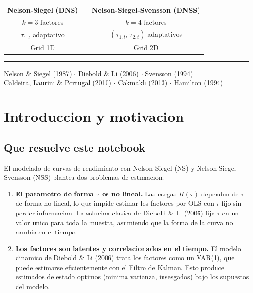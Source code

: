 \documentclass[12pt, a4paper]{article}
\theoremstyle{plain}
\theoremstyle{definition}
\theoremstyle{remark}
\begin{document}
\begin{titlepage}
\begin{center}
\vspace{1.8cm}

\begin{tabular}{ccc}
\textbf{Nelson-Siegel (DNS)} && \textbf{Nelson-Siegel-Svensson (DNSS)} \\[4pt]
$k = 3$ factores && $k = 4$ factores \\[2pt]
$\tau_{1,t}$ adaptativo && $(\tau_{1,t},\, \tau_{2,t})$ adaptativos \\[2pt]
Grid 1D && Grid 2D \\
\end{tabular}

\vspace{2.0cm}
\rule{\textwidth}{0.4pt}
\vspace{0.4cm}

{\small\sffamily\color{azulclaro}
  Nelson \& Siegel (1987) $\cdot$
  Diebold \& Li (2006) $\cdot$
  Svensson (1994)\\
  Caldeira, Laurini \& Portugal (2010) $\cdot$
  Cakmaklı (2013) $\cdot$
  Hamilton (1994)
}
\end{center}
\end{titlepage}

\nopagecolor
\color{black}

\tableofcontents
\newpage

\section{Introduccion y motivacion}

\subsection{Que resuelve este notebook}

El modelado de curvas de rendimiento con Nelson-Siegel (NS) y
Nelson-Siegel-Svensson (NSS) plantea dos problemas de estimacion:

\begin{enumerate}[leftmargin=1.5em]
  \item \textbf{El parametro de forma $\tau$ es no lineal.}
        Las cargas $H(\tau)$ dependen de $\tau$ de forma no lineal,
        lo que impide estimar los factores por OLS con $\tau$ fijo sin
        perder informacion. La solucion clasica de Diebold \& Li (2006)
        fija $\tau$ en un valor unico para toda la muestra, asumiendo que
        la forma de la curva no cambia en el tiempo.

  \item \textbf{Los factores son latentes y correlacionados en el tiempo.}
        El modelo dinamico de Diebold \& Li (2006) trata los factores como
        un VAR(1), que puede estimarse eficientemente con el Filtro de Kalman.
        Esto produce estimados de estado optimos (minima varianza, insesgados)
        bajo los supuestos del modelo.
\end{enumerate}
\end{document}

